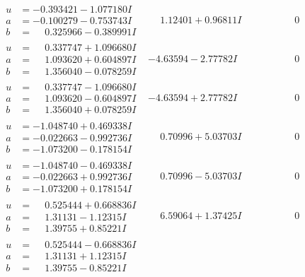 \documentclass[1p]{elsarticle_modified}
\theoremstyle{definition}
\begin{document}
$$\begin{array}{c|c|c}
\begin{aligned}
u &= -0.393421 - 1.077180 I \\
a &= -0.100279 - 0.753743 I \\
b &= \phantom{-}0.325966 - 0.389991 I\end{aligned}
 & \phantom{-}1.12401 + 0.96811 I & \phantom{-0.000000 } 0 \\ \hline\begin{aligned}
u &= \phantom{-}0.337747 + 1.096680 I \\
a &= \phantom{-}1.093620 + 0.604897 I \\
b &= \phantom{-}1.356040 - 0.078259 I\end{aligned}
 & -4.63594 - 2.77782 I & \phantom{-0.000000 } 0 \\ \hline\begin{aligned}
u &= \phantom{-}0.337747 - 1.096680 I \\
a &= \phantom{-}1.093620 - 0.604897 I \\
b &= \phantom{-}1.356040 + 0.078259 I\end{aligned}
 & -4.63594 + 2.77782 I & \phantom{-0.000000 } 0 \\ \hline\begin{aligned}
u &= -1.048740 + 0.469338 I \\
a &= -0.022663 - 0.992736 I \\
b &= -1.073200 - 0.178154 I\end{aligned}
 & \phantom{-}0.70996 + 5.03703 I & \phantom{-0.000000 } 0 \\ \hline\begin{aligned}
u &= -1.048740 - 0.469338 I \\
a &= -0.022663 + 0.992736 I \\
b &= -1.073200 + 0.178154 I\end{aligned}
 & \phantom{-}0.70996 - 5.03703 I & \phantom{-0.000000 } 0 \\ \hline\begin{aligned}
u &= \phantom{-}0.525444 + 0.668836 I \\
a &= \phantom{-}1.31131 - 1.12315 I \\
b &= \phantom{-}1.39755 + 0.85221 I\end{aligned}
 & \phantom{-}6.59064 + 1.37425 I & \phantom{-0.000000 } 0 \\ \hline\begin{aligned}
u &= \phantom{-}0.525444 - 0.668836 I \\
a &= \phantom{-}1.31131 + 1.12315 I \\
b &= \phantom{-}1.39755 - 0.85221 I\end{aligned}

\end{array}$$
\end{document}
